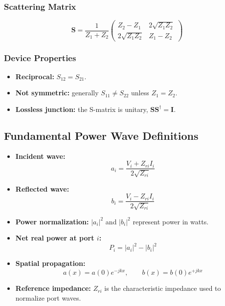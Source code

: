 \documentclass{article}
\begin{document}
\subsubsection*{Scattering Matrix}
\[
\mathbf{S} = \frac{1}{Z_1 + Z_2}
\begin{pmatrix}
Z_2 - Z_1 & 2\sqrt{Z_1 Z_2} \\
2\sqrt{Z_1 Z_2} & Z_1 - Z_2
\end{pmatrix}
\]

\subsubsection*{Device Properties}
\begin{itemize}
    \item \textbf{Reciprocal:} $S_{12} = S_{21}$.
    \item \textbf{Not symmetric:} generally $S_{11} \neq S_{22}$ unless $Z_1 = Z_2$.
    \item \textbf{Lossless junction:} the S-matrix is unitary, $\mathbf{S}\mathbf{S}^\dagger = \mathbf{I}$.
\end{itemize}


\subsection*{Fundamental Power Wave Definitions}
\begin{itemize}
    \item \textbf{Incident wave:} 
    \[
    a_i = \frac{V_i + Z_{ri} I_i}{2\sqrt{Z_{ri}}}
    \]
    \item \textbf{Reflected wave:}
    \[
    b_i = \frac{V_i - Z_{ri} I_i}{2\sqrt{Z_{ri}}}
    \]
    \item \textbf{Power normalization:} $|a_i|^2$ and $|b_i|^2$ represent power in watts.
    \item \textbf{Net real power at port $i$:}
    \[
    P_i = |a_i|^2 - |b_i|^2
    \]
    \item \textbf{Spatial propagation:}
    \[
    a(x) = a(0)e^{-jkx}, \qquad b(x) = b(0)e^{+jkx}
    \]
    \item \textbf{Reference impedance:} $Z_{ri}$ is the characteristic impedance used to normalize port waves.
\end{itemize}
\end{document}
